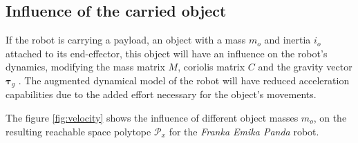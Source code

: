 \subsection{Influence of the carried object}

If the robot is carrying a payload, an object with a mass $m_o$ and inertia $i_o$ attached to its end-effector, this object will have an influence on the robot's dynamics, modifying the mass matrix $M$, coriolis matrix $C$ and the gravity vector $\bm{\tau}_g$ \cite{hamad2019}.
The augmented dynamical model of the robot will have reduced acceleration capabilities due to the added effort necessary for the object's movements.

The figure \ref{fig:velocity} shows the influence of different object masses $m_o$, on the resulting reachable space polytope $\mathcal{P}_x$ for the \textit{Franka Emika Panda} robot. 








